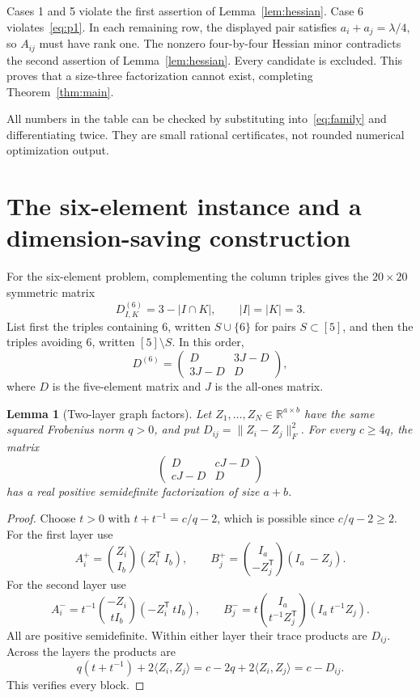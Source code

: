 \documentclass[11pt]{article}
\newtheorem{lemma}[theorem]{Lemma}
\begin{document}
Cases 1 and 5 violate the first assertion of Lemma~\ref{lem:hessian}. Case 6 violates~\eqref{eq:p1}. In each remaining row, the displayed pair satisfies $a_i+a_j=\lambda/4$, so $A_{ij}$ must have rank one. The nonzero four-by-four Hessian minor contradicts the second assertion of Lemma~\ref{lem:hessian}. Every candidate is excluded. This proves that a size-three factorization cannot exist, completing Theorem~\ref{thm:main}.

All numbers in the table can be checked by substituting into~\eqref{eq:family} and differentiating twice. They are small rational certificates, not rounded numerical optimization output.

\section{The six-element instance and a dimension-saving construction}
For the six-element problem, complementing the column triples gives the $20\times20$ symmetric matrix
\[
 D^{(6)}_{I,K}=3-|I\cap K|,\qquad |I|=|K|=3.
\]
List first the triples containing $6$, written $S\cup\{6\}$ for pairs $S\subset[5]$, and then the triples avoiding $6$, written $[5]\setminus S$. In this order,
\begin{equation}\label{eq:six-block}
 D^{(6)}=\begin{pmatrix}D&3J-D\\3J-D&D\end{pmatrix},
\end{equation}
where $D$ is the five-element matrix and $J$ is the all-ones matrix.

\begin{lemma}[Two-layer graph factors]\label{lem:two-layer}
Let $Z_1,\ldots,Z_N\in\mathbb R^{a\times b}$ have the same squared Frobenius norm $q>0$, and put $D_{ij}=\|Z_i-Z_j\|_F^2$. For every $c\geq4q$, the matrix
\[
 \begin{pmatrix}D&cJ-D\\cJ-D&D\end{pmatrix}
\]
has a real positive semidefinite factorization of size $a+b$.
\end{lemma}
\begin{proof}
Choose $t>0$ with $t+t^{-1}=c/q-2$, which is possible since $c/q-2\geq2$. For the first layer use
\[
 A_i^+=\binom{Z_i}{I_b}(Z_i^{\mathsf T}\ I_b),\qquad
 B_j^+=\binom{I_a}{-Z_j^{\mathsf T}}(I_a\ -Z_j).
\]
For the second layer use
\[
 A_i^-=t^{-1}\binom{-Z_i}{tI_b}(-Z_i^{\mathsf T}\ tI_b),\qquad
 B_j^-=t\binom{I_a}{t^{-1}Z_j^{\mathsf T}}(I_a\ t^{-1}Z_j).
\]
All are positive semidefinite. Within either layer their trace products are $D_{ij}$. Across the layers the products are
\[
 q(t+t^{-1})+2\langle Z_i,Z_j\rangle
 =c-2q+2\langle Z_i,Z_j\rangle=c-D_{ij}.
\]
This verifies every block.
\end{proof}
\end{document}
